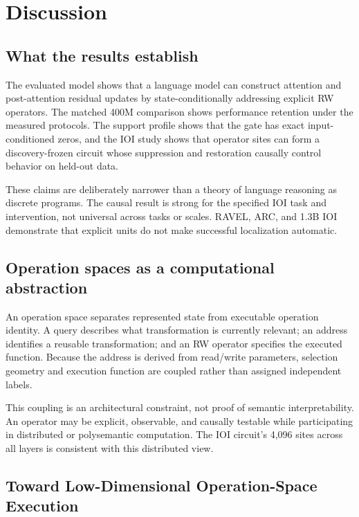 \documentclass{article}
\begin{document}
\section{Discussion}
\label{sec:discussion}

\subsection{What the results establish}

The evaluated model shows that a language model can construct attention and
post-attention residual updates by state-conditionally addressing explicit
RW operators. The matched 400M comparison shows performance retention under
the measured protocols. The support profile shows that the gate has exact
input-conditioned zeros, and the IOI study shows that operator sites can form
a discovery-frozen circuit whose suppression and restoration causally control
behavior on held-out data.

These claims are deliberately narrower than a theory of language reasoning as
discrete programs. The causal result is strong for the specified IOI task and
intervention, not universal across tasks or scales. RAVEL, ARC, and 1.3B IOI
demonstrate that explicit units do not make successful localization automatic.

\subsection{Operation spaces as a computational abstraction}

An operation space separates represented state from executable operation
identity. A query describes what transformation is currently relevant; an
address identifies a reusable transformation; and an RW operator specifies
the executed function. Because the address is derived from read/write
parameters, selection geometry and execution function are coupled rather than
assigned independent labels.

This coupling is an architectural constraint, not proof of semantic
interpretability. An operator may be explicit, observable, and causally
testable while participating in distributed or polysemantic computation.
The IOI circuit's 4,096 sites across all layers is consistent with this
distributed view.

\subsection{Toward Low-Dimensional Operation-Space Execution}
\label{sec:future-low-d}
\end{document}
